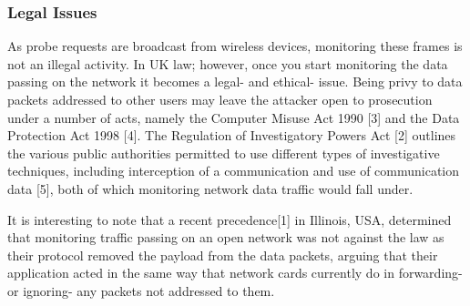 \subsubsection{Legal Issues}
As probe requests are broadcast from wireless devices, monitoring these frames is not an illegal activity. In UK law; however, once you start monitoring the data passing on the network it becomes a legal- and ethical- issue. Being privy to data packets addressed to other users may leave the attacker open to prosecution under a number of acts, namely the Computer Misuse Act 1990 [3] and the Data Protection Act 1998 [4]. The Regulation of Investigatory Powers Act [2] outlines the various public authorities permitted to use different types of investigative techniques, including interception of a communication and use of communication data [5], both of which monitoring network data traffic would fall under.

It is interesting to note that a recent precedence[1] in Illinois, USA, determined that monitoring traffic passing on an open network was not against the law as their protocol removed the payload from the data packets, arguing that their application acted in the same way that network cards currently do in forwarding- or ignoring- any packets not addressed to them. 
